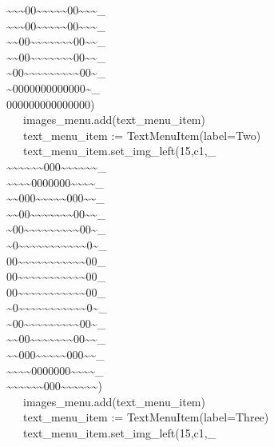 {\~{}\~{}\~{}00\~{}\~{}\~{}\~{}\~{}00\~{}\~{}\~{}\_ \\
\~{}\~{}\~{}00\~{}\~{}\~{}\~{}\~{}00\~{}\~{}\~{}\_ \\
\~{}\~{}00\~{}\~{}\~{}\~{}\~{}\~{}\~{}00\~{}\~{}\_ \\
\~{}\~{}00\~{}\~{}\~{}\~{}\~{}\~{}\~{}00\~{}\~{}\_ \\
\~{}00\~{}\~{}\~{}\~{}\~{}\~{}\~{}\~{}\~{}00\~{}\_ \\
\~{}0000000000000\~{}\_ \\
000000000000000{\textquotedbl}) \\
\>   \ \ \ images\_menu.add(text\_menu\_item) \\
\>   \ \ \ text\_menu\_item :=
TextMenuItem({\textquotedbl}label=Two{\textquotedbl}) \\
\>   \ \ \ text\_menu\_item.set\_img\_left({\textquotedbl}15,c1,\_ \\
\~{}\~{}\~{}\~{}\~{}\~{}000\~{}\~{}\~{}\~{}\~{}\~{}\_ \\
\~{}\~{}\~{}\~{}0000000\~{}\~{}\~{}\~{}\_ \\
\~{}\~{}000\~{}\~{}\~{}\~{}\~{}000\~{}\~{}\_ \\
\~{}\~{}00\~{}\~{}\~{}\~{}\~{}\~{}\~{}00\~{}\~{}\_ \\
\~{}00\~{}\~{}\~{}\~{}\~{}\~{}\~{}\~{}\~{}00\~{}\_ \\
\~{}0\~{}\~{}\~{}\~{}\~{}\~{}\~{}\~{}\~{}\~{}\~{}0\~{}\_ \\
00\~{}\~{}\~{}\~{}\~{}\~{}\~{}\~{}\~{}\~{}\~{}00\_ \\
00\~{}\~{}\~{}\~{}\~{}\~{}\~{}\~{}\~{}\~{}\~{}00\_ \\
00\~{}\~{}\~{}\~{}\~{}\~{}\~{}\~{}\~{}\~{}\~{}00\_ \\
\~{}0\~{}\~{}\~{}\~{}\~{}\~{}\~{}\~{}\~{}\~{}\~{}0\~{}\_ \\
\~{}00\~{}\~{}\~{}\~{}\~{}\~{}\~{}\~{}\~{}00\~{}\_ \\
\~{}\~{}00\~{}\~{}\~{}\~{}\~{}\~{}\~{}00\~{}\~{}\_ \\
\~{}\~{}000\~{}\~{}\~{}\~{}\~{}000\~{}\~{}\_ \\
\~{}\~{}\~{}\~{}0000000\~{}\~{}\~{}\~{}\_ \\
\~{}\~{}\~{}\~{}\~{}\~{}000\~{}\~{}\~{}\~{}\~{}\~{}{\textquotedbl}) \\
\>   \ \ \ images\_menu.add(text\_menu\_item) \\
\>   \ \ \ text\_menu\_item :=
TextMenuItem({\textquotedbl}label=Three{\textquotedbl}) \\
\>   \ \ \ text\_menu\_item.set\_img\_left({\textquotedbl}15,c1,\_ \\
}

